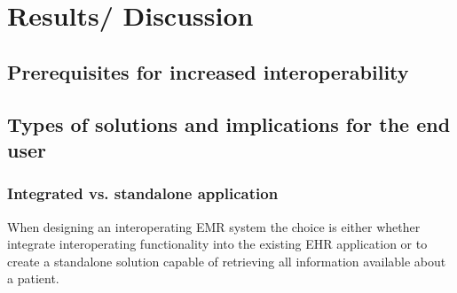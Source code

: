 \documentclass[14pt]{article}
\begin{document}

\newpage

\section{Results/ Discussion}
\label{sec:Results}

\subsection{Prerequisites for increased interoperability}

\subsection{Types of solutions and implications for the end user}

\subsubsection{Integrated vs. standalone application}
When designing an interoperating EMR system the choice is either whether integrate interoperating functionality into the existing EHR application or to create a standalone solution capable of retrieving all information available about a patient.
\end{document}
